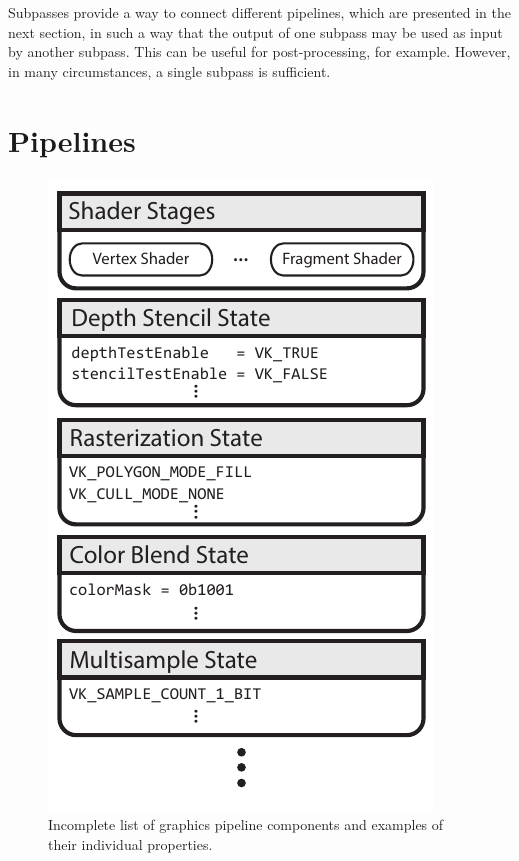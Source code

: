     Subpasses provide a way to connect different pipelines, which are presented in the next section, in such a way that the output of one subpass may be used as input by another subpass.
    This can be useful for post-processing, for example.
    However, in many circumstances, a single subpass is sufficient.

  \section{Pipelines}
  \label{sec:Pipelines}


    \begin{figure}
      \label{fig:GraphicsPipeline}
      \centering
      \includegraphics[height=0.4\textheight]{Main/Images/GraphicsPipeline}
      \caption{Incomplete list of graphics pipeline components and examples of their individual properties.}
    \end{figure}

